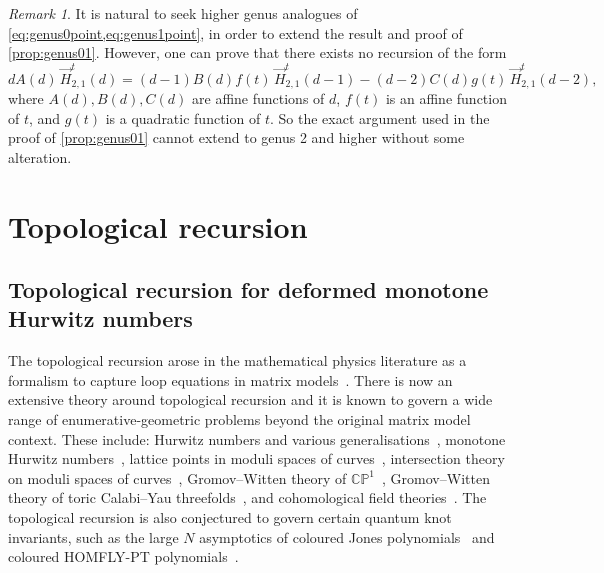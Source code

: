 \documentclass[a4paper]{article}
\theoremstyle{plain}
\numberwithin{theorem}{section}
\theoremstyle{definition}
\theoremstyle{remark}
\newtheorem{remark}[theorem]{Remark}
\newcommand{\HN}[3]{\vec{H}^t_{#1,#2}(#3)}
\begin{document}
\begin{remark}
It is natural to seek higher genus analogues of \cref{eq:genus0point,eq:genus1point}, in order to extend the result and proof of \cref{prop:genus01}. However, one can prove that there exists no recursion of the form
\[
d A(d) \, \HN{2}{1}{d} = (d-1) B(d) f(t) \, \HN{2}{1}{d-1} - (d-2) C(d) g(t) \, \HN{2}{1}{d-2},
\]
where $A(d), B(d), C(d)$ are affine functions of $d$, $f(t)$ is an affine function of $t$, and $g(t)$ is a quadratic function of $t$. So the exact argument used in the proof of \cref{prop:genus01} cannot extend to genus 2 and higher without some alteration.
\end{remark}



\section{Topological recursion} \label{sec:TR}

\subsection{Topological recursion for deformed monotone Hurwitz numbers}

The topological recursion arose in the mathematical physics literature as a formalism to capture loop equations in matrix models~\cite{che-eyn06, eyn-ora07}. There is now an extensive theory around topological recursion and it is known to govern a wide range of enumerative-geometric problems beyond the original matrix model context. These include: Hurwitz numbers and various generalisations~\cite{bou-mar08, BHLM14, do-lei-nor16, eyn-mul-saf11, BDKLM22, DKPS19}, monotone Hurwitz numbers~\cite{do-dye-mat17}, lattice points in moduli spaces of curves~\cite{nor13, cha-do-mos19}, intersection theory on moduli spaces of curves~\cite{eyn-ora07, eyn14}, Gromov--Witten theory of $\mathbb{CP}^1$~\cite{nor-sco14, DOSS14}, Gromov--Witten theory of toric Calabi--Yau threefolds~\cite{BKMP09, eyn-ora15, fan-liu-zon20}, and cohomological field theories~\cite{DOSS14}. The topological recursion is also conjectured to govern certain quantum knot invariants, such as the large $N$ asymptotics of coloured Jones polynomials~\cite{dij-fuj-man11, bor-eyn15} and coloured HOMFLY-PT polynomials~\cite{GJKS15}.
\end{document}
